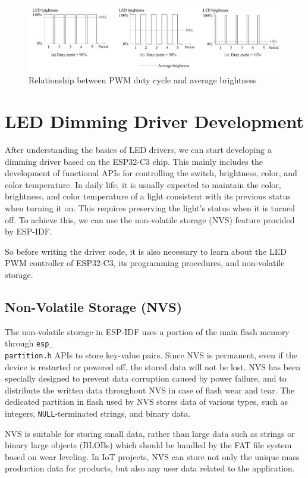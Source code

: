 \documentclass[a4paper,12pt,openany]{book}
\begin{document}
\begin{figure}[h!]
    \centering
    \includegraphics[width=\textwidth]{D6Z/6-12}
    \caption{Relationship between PWM duty cycle and average brightness}
\end{figure}

\section{LED Dimming Driver Development}
After understanding the basics of LED drivers, we can start developing a dimming driver based on the ESP32-C3 chip. This mainly includes the development of functional APIs for controlling the switch, brightness, color, and color temperature. In daily life, it is usually expected to maintain the color, brightness, and color temperature of a light consistent with its previous status when turning it on. This requires preserving the light’s status when it is turned off. To achieve this, we can use the non-volatile storage (NVS) feature provided by ESP-IDF.

So before writing the driver code, it is also necessary to learn about the LED PWM controller of ESP32-C3, its programming procedures, and non-volatile storage.

\subsection{Non-Volatile Storage (NVS)}
The non-volatile storage in ESP-IDF uses a portion of the main flash memory through \verb|esp_|\\ \verb|partition.h| APIs to store key-value pairs. Since NVS is permanent, even if the device is restarted or powered off, the stored data will not be lost. NVS has been specially designed to prevent data corruption caused by power failure, and to distribute the written data throughout NVS in case of flash wear and tear. The dedicated partition in flash used by NVS stores data of various types, such as integers, \verb|NULL|-terminated strings, and binary data.

NVS is suitable for storing small data, rather than large data such as strings or binary large objects (BLOBs) which should be handled by the FAT file system based on wear leveling. In IoT projects, NVS can store not only the unique mass production data for products, but also any user data related to the application.
\end{document}
